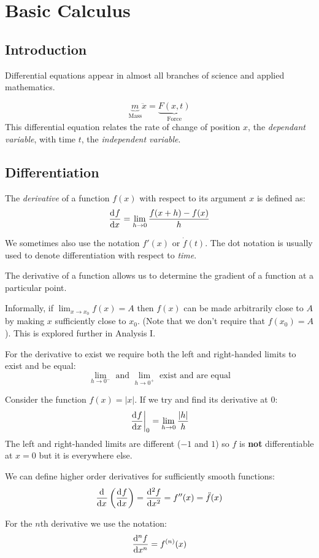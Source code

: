 \documentclass[../main.tex]{subfiles}
\begin{document}
\chapter{Basic Calculus}
\section{Introduction}
Differential equations appear in almost all branches of science and applied mathematics.
\begin{example}
  \[
    \underbrace{m}_{\text{Mass}} \ddot{x} = \underbrace{F(x, t)}_{\text{Force}}
  \]
  This differential equation relates the rate of change of position $x$, the \textit{dependant variable}, with time $t$, the \textit{independent variable}.
\end{example}
\section{Differentiation}
\begin{definition}[Derivative]
  The \textit{derivative} of a function $f(x)$ with respect to its argument $x$ is defined as:
  \[
    \deriv{f}{x} = \lim_{h \to 0} \frac{f(x + h) - f(x)}{h}
  \]
\end{definition}
\begin{remark}[Notation]
  We sometimes also use the notation $f'(x)$ or $\dot{f}(t)$.
  The dot notation is usually used to denote differentiation with respect to \textit{time}.
\end{remark}
The derivative of a function allows us to determine the gradient of a function at a particular point.
\begin{definition}
  Informally, if $\lim_{x \to x_0} f(x) = A$ then $f(x)$ can be made arbitrarily close to $A$ by making $x$ sufficiently close to $x_0$.
  (Note that we don't require that $f(x_0) = A$).
  This is explored further in Analysis I.
\end{definition}
\begin{remark}[Note]
  For the derivative to exist we require both the left and right-handed limits to exist and be equal:
  \[
    \lim_{h \to 0^-} \text{ and } \lim_{h \to 0^+} \text{ exist and are equal}
  \]
\end{remark}
\begin{example}
  Consider the function $f(x) = |x|$.
  If we try and find its derivative at 0:
  \[
    \at{\deriv{f}{x}}{0} = \lim_{h \to 0} \frac{|h|}{h}
  \]
  The left and right-handed limits are different ($-1$ and $1$) so $f$ is \textbf{not} differentiable at $x = 0$ but it is everywhere else.
\end{example}
We can define higher order derivatives for sufficiently smooth functions:
\[
  \deriv{}{x}\left(\deriv{f}{x}\right) = \deriv[2]{f}{x} = f''(x) = \ddot{f}(x)
\]
\begin{remark}[Notation]
  For the $n$th derivative we use the notation:
  \[
    \deriv[n]{f}{x} = f^{(n)}(x)
  \]
\end{remark}
\end{document}
